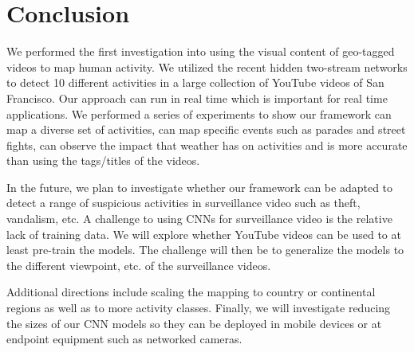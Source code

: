 \documentclass[sigconf]{acmart}
\begin{document}
	
	\section{Conclusion}
	\label{sec:conclusion}
	We performed the first investigation into using the visual content of geo-tagged videos to map human activity. We utilized the recent hidden two-stream networks to detect 10 different activities in a large collection of YouTube videos of San Francisco. Our approach can run in real time which is important for real time applications. We performed a series of experiments to show our framework can map a diverse set of activities, can map specific events such as parades and street fights, can observe the impact that weather has on activities and is more accurate than using the tags/titles of the videos.
	
	In the future, we plan to investigate whether our framework can be adapted to detect a range of suspicious activities in surveillance video such as theft, vandalism, etc. A challenge to using CNNs for surveillance video is the relative lack of training data. We will explore whether YouTube videos can be used to at least pre-train the models. The challenge will then be to generalize the models to the different viewpoint, etc. of the surveillance videos.
	
	Additional directions include scaling the mapping to country or continental regions as well as to more activity classes. Finally, we will investigate reducing the sizes of our CNN models so they can be deployed in mobile devices or at endpoint equipment such as networked cameras.
	
\end{document}
